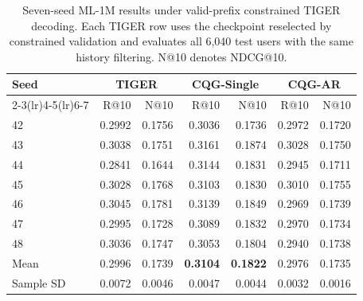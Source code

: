 \documentclass[letterpaper]{article}
\begin{document}
\begin{table}[H]
\centering
\small
\setlength{\tabcolsep}{5pt}
\begin{tabular}{lrrrrrr}
\toprule
Seed & \multicolumn{2}{c}{TIGER} & \multicolumn{2}{c}{CQG-Single} &
\multicolumn{2}{c}{CQG-AR} \\
\cmidrule(lr){2-3}\cmidrule(lr){4-5}\cmidrule(lr){6-7}
& R@10 & N@10 & R@10 & N@10 & R@10 & N@10 \\
\midrule
42 & 0.2992 & 0.1756 & 0.3036 & 0.1736 & 0.2972 & 0.1720 \\
43 & 0.3038 & 0.1751 & 0.3161 & 0.1874 & 0.3028 & 0.1750 \\
44 & 0.2841 & 0.1644 & 0.3144 & 0.1831 & 0.2945 & 0.1711 \\
45 & 0.3028 & 0.1768 & 0.3103 & 0.1830 & 0.3010 & 0.1755 \\
46 & 0.3045 & 0.1781 & 0.3139 & 0.1849 & 0.2969 & 0.1739 \\
47 & 0.2995 & 0.1728 & 0.3089 & 0.1832 & 0.2970 & 0.1734 \\
48 & 0.3036 & 0.1747 & 0.3053 & 0.1804 & 0.2940 & 0.1738 \\
\midrule
Mean & 0.2996 & 0.1739 & \textbf{0.3104} & \textbf{0.1822} & 0.2976 & 0.1735 \\
Sample SD & 0.0072 & 0.0046 & 0.0047 & 0.0044 & 0.0032 & 0.0016 \\
\bottomrule
\end{tabular}
\caption{Seven-seed ML-1M results under valid-prefix constrained TIGER
decoding. Each TIGER row uses the checkpoint reselected by constrained
validation and evaluates all 6,040 test users with the same history filtering.
N@10 denotes NDCG@10.}
\label{tab:ml1m-seven-seed}
\end{table}
\end{document}
